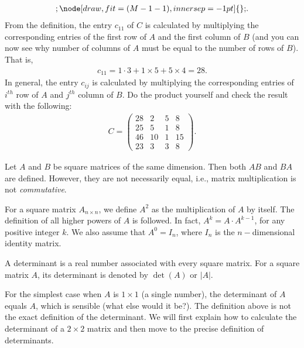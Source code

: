 \documentclass{subfile}
\begin{document}
\begin{example}
\begin{align*}
{{					};
					\node[draw,fit=(M-1-1),inner sep=-1pt] {};
				}
				.
				\end{align*}
			From the definition, the entry $c_{11}$ of $C$ is calculated by multiplying the corresponding entries of the first row of $A$ and the first column of $B$ (and you can now see why number of columns of $A$ must be equal to the number of rows of $B$). That is,
				\begin{align*}
					c_{11}=1 \cdot 3 + 1 \times 5 + 5 \times 4 = 28.
				\end{align*}
			In general, the entry $c_{ij}$ is calculated by multiplying the corresponding entries of $i^{th}$ row of $A$ and $j^{th}$ column of $B$. Do the product yourself and check the result with the following:
			\begin{align*}
			C = \begin{pmatrix}
				{28}&2&5&8\\
				{25}&5&1&8\\
				{46}&{10}&1&{15}\\
				{23}&3&3&8
				\end{pmatrix}.
			\end{align*}
	\end{example}

	\begin{note}
		Let $A$ and $B$ be square matrices of the same dimension. Then both $AB$ and $BA$ are defined. However, they are not necessarily equal, i.e., matrix multiplication is not \textit{commutative}.
	\end{note}


	\begin{definition}
		For a square matrix $A_{n\times n}$, we define $A^2$ as the multiplication of $A$ by itself. The definition of all higher powers of $A$ is followed. In fact, $A^k=A \cdot A^{k-1}$, for any positive integer $k$. We also assume that $A^{0}=I_n$, where $I_n$ is the $n-$dimensional identity matrix.
	\end{definition}

	\begin{definition}
		A determinant is a real number associated with every square matrix. For a square matrix $A$, its determinant is denoted by $\det(A)$ or $|A|$.
	\end{definition}

For the simplest case when $A$ is $1\times 1$ (a single number), the determinant of $A$ equals $A$, which is sensible (what else would it be?). The definition above is not the exact definition of the determinant. We will first explain how to calculate the determinant of a $2\times 2$ matrix and then move to the precise definition of determinants.
\end{document}
